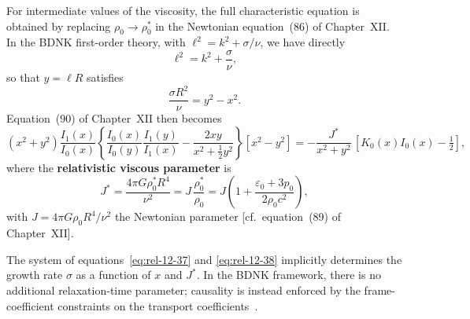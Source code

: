 For intermediate values of the viscosity, the full characteristic
equation is obtained by replacing $\rho_{0}\to\rho_{0}^{*}$ in the
Newtonian equation~(86) of Chapter~XII.  In the BDNK first-order
theory, with $\ell^{2}=k^{2}+\sigma/\nu$, we have directly
\begin{equation}
\label{eq:rel-12-36}
\ell^{2} = k^{2} + \frac{\sigma}{\nu},
\end{equation}
so that $y = \ell R$ satisfies
\begin{equation}
\label{eq:rel-12-37}
\frac{\sigma R^{2}}{\nu} = y^{2}-x^{2}.
\end{equation}
Equation~(90) of Chapter~XII then becomes
\begin{equation}
\label{eq:rel-12-38}
(x^{2}+y^{2})\frac{I_{1}(x)}{I_{0}(x)}
  \left\{\frac{I_{0}(x)}{I_{0}(y)}\frac{I_{1}(y)}{I_{1}(x)}
  - \frac{2xy}{x^{2}+\tfrac{1}{2}y^{2}}\right\}
  [x^{2}-y^{2}]
  = -\frac{J^{*}}{x^{2}+y^{2}}\,
  \left[K_{0}(x)I_{0}(x)-\tfrac{1}{2}\right],
\end{equation}
where the \textbf{relativistic viscous parameter} is
\begin{equation}
\label{eq:rel-12-39}
J^{*} = \frac{4\pi G\rho_{0}^{*}R^{4}}{\nu^{2}}
  = J\,\frac{\rho_{0}^{*}}{\rho_{0}}
  = J\!\left(1+\frac{\varepsilon_{0}+3p_{0}}{2\rho_{0}c^{2}}\right),
\end{equation}
with $J = 4\pi G\rho_{0}R^{4}/\nu^{2}$ the Newtonian parameter
[cf.\ equation~(89) of Chapter~XII].

The system of equations~\eqref{eq:rel-12-37} and \eqref{eq:rel-12-38}
implicitly determines the growth rate $\sigma$ as a function of $x$ and
$J^{*}$.  In the BDNK framework, there is no additional
relaxation-time parameter; causality is instead enforced by the
frame-coefficient constraints on the transport
coefficients~\cite{BemficaDNK2023,Kovtun2019}.

